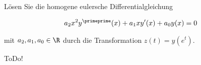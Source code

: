 
\begin{exercise}

Lösen Sie die homogene eulersche Differentialgleichung

\begin{align*}
    a_2 x^2 y^\primeprime(x) + a_1 x y^\prime(x) + a_0 y(x) = 0
\end{align*}

mit $a_2, a_1, a_0 \in \R$ durch die Transformation $z(t) = y(e^t)$.

\end{exercise}


\begin{solution}

ToDo!

\end{solution}

